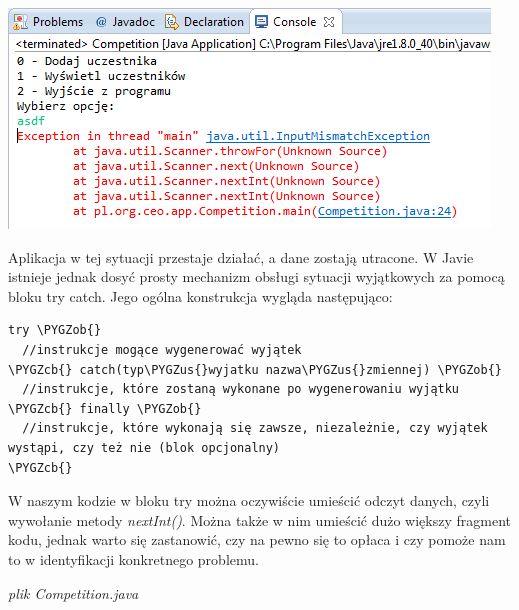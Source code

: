 \documentclass[letterpaper,10pt,english]{sphinxmanual}
\def\PYGZus{\char`\_}
\def\PYGZob{\char`\{}
\def\PYGZcb{\char`\}}
\begin{document}
{\hfill\includegraphics{inputmismatch.png}\hfill}

Aplikacja w tej sytuacji przestaje działać, a dane zostają utracone. W Javie istnieje jednak dosyć prosty mechanizm obsługi sytuacji wyjątkowych za pomocą bloku try catch. Jego ogólna konstrukcja wygląda następująco:

\begin{Verbatim}[commandchars=\\\{\}]
try \PYGZob{}
  //instrukcje mogące wygenerować wyjątek
\PYGZcb{} catch(typ\PYGZus{}wyjatku nazwa\PYGZus{}zmiennej) \PYGZob{}
  //instrukcje, które zostaną wykonane po wygenerowaniu wyjątku
\PYGZcb{} finally \PYGZob{}
  //instrukcje, które wykonają się zawsze, niezależnie, czy wyjątek wystąpi, czy też nie (blok opcjonalny)
\PYGZcb{}
\end{Verbatim}

W naszym kodzie w bloku try można oczywiście umieścić odczyt danych, czyli wywołanie metody \emph{nextInt()}. Można także w nim umieścić dużo większy fragment kodu, jednak warto się zastanowić, czy na pewno się to opłaca i czy pomoże nam to w identyfikacji konkretnego problemu.

\emph{plik Competition.java}
\end{document}
